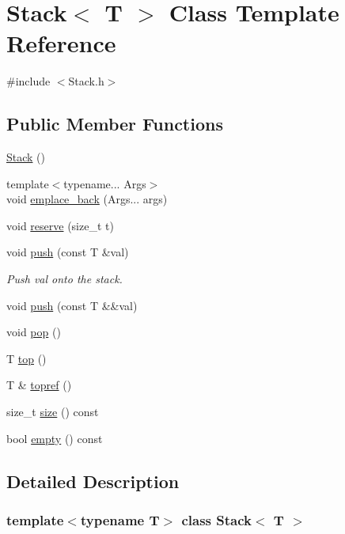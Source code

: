 \hypertarget{class_stack}{}\section{Stack$<$ T $>$ Class Template Reference}
\label{class_stack}


{\ttfamily \#include $<$Stack.\+h$>$}

\subsection*{Public Member Functions}
\begin{DoxyCompactItemize}
\item 
\hyperlink{class_stack_aefee698059467258bbd79045aca62a63}{Stack} ()
\item 
{\footnotesize template$<$typename... Args$>$ }\\void \hyperlink{class_stack_a9f5e3b440e955d4c4e67203d8ad589c0}{emplace\+\_\+back} (Args... args)
\item 
void \hyperlink{class_stack_a112b1dda8f0187bd63c4cd0cb877bd92}{reserve} (size\+\_\+t t)
\item 
void \hyperlink{class_stack_a6e8312460808f468b004d709d3308757}{push} (const T \&val)
\begin{DoxyCompactList}\small\item\em Push val onto the stack. \end{DoxyCompactList}\item 
void \hyperlink{class_stack_ace7170c5a65f27155d77af269054943a}{push} (const T \&\&val)
\item 
void \hyperlink{class_stack_a2723aec5c7e2611b97fcffeb7709de33}{pop} ()
\item 
T \hyperlink{class_stack_ad461f6de40c8672dbf743068f4515061}{top} ()
\item 
T \& \hyperlink{class_stack_a318da5613921ddf481a21c62ce006c3c}{topref} ()
\item 
size\+\_\+t \hyperlink{class_stack_aa34222dbc28544189d97add837498b71}{size} () const
\item 
bool \hyperlink{class_stack_a275d43ff89b91a9c6c5636cc8539d285}{empty} () const
\end{DoxyCompactItemize}


\subsection{Detailed Description}
\subsubsection*{template$<$typename T$>$\newline
class Stack$<$ T $>$}


